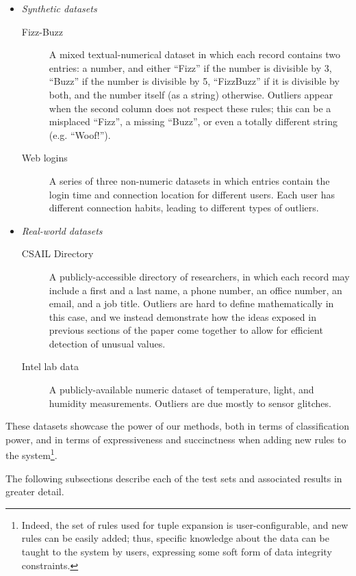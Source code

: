 \begin{itemize}
\item \emph{Synthetic datasets}
  \begin{description}
  \item[Fizz-Buzz] A mixed textual-numerical dataset in which each record contains two entries: a number, and either ``Fizz'' if the number is divisible by 3, ``Buzz'' if the number is divisible by 5, ``FizzBuzz'' if it is divisible by both, and the number itself (as a string) otherwise. Outliers appear when the second column does not respect these rules; this can be a misplaced ``Fizz'', a missing ``Buzz'', or even a totally different string (e.g. ``Woof!'').
  \item[Web logins] A series of three non-numeric datasets in which entries contain the login time and connection location for different users. Each user has different connection habits, leading to different types of outliers.
  \end{description}
\item \emph{Real-world datasets}
  \begin{description}
  \item[CSAIL Directory] A publicly-accessible directory of researchers, in which each record may include a first and a last name, a phone number, an office number, an email, and a job title. Outliers are hard to define mathematically in this case, and we instead demonstrate how the ideas exposed in previous sections of the paper come together to allow for efficient detection of unusual values.
  \item[Intel lab data] A publicly-available numeric dataset of temperature, light, and humidity measurements. Outliers are due mostly to sensor glitches.
  \end{description}
\end{itemize}

These datasets showcase the power of our methods, both in terms of classification power, and in terms of expressiveness and succinctness when adding new rules to the system\footnote{Indeed, the set of rules used for tuple expansion is user-configurable, and new rules can be easily added; thus, specific knowledge about the data can be taught to the system by users, expressing some soft form of data integrity constraints.}.

The following subsections describe each of the test sets and associated results in greater detail.





%
%
